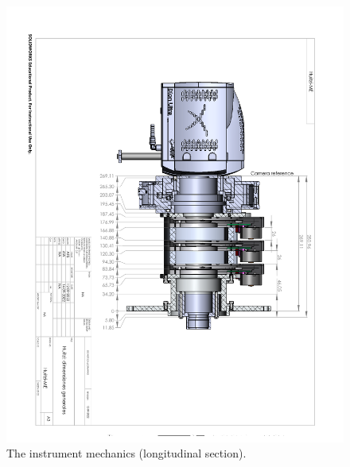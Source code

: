 \begin{figure}
\begin{center}
\includegraphics[angle=180,width=0.9\linewidth]{figures/huitzi-f20-section.pdf}
\end{center}
\caption{The instrument mechanics (longitudinal section).}
\label{figure:huitzi-f20-section}
\end{figure}

